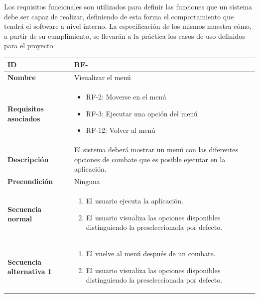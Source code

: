 Los requisitos funcionales son utilizados para definir las funciones que un sistema debe ser capaz de realizar, definiendo de esta forma el comportamiento que tendrá el software a nivel interno. La especificación de los mismos muestra cómo, a partir de su cumplimiento, se llevarán a la práctica los casos de uso definidos para el proyecto.


\setcounter{contador_requisitos_funcionales}{1}

\begin{center}
	\begin{tabular}{ | p{4.7cm} | p{10cm} | } 
		\hline
		
		\textbf{ID} & RF-\arabic{contador_requisitos_funcionales}
		{contador_requisitos_funcionales} \\
		
		\hline 
		\textbf{Nombre}&
		Visualizar el menú\\ 
		
		\hline
		\textbf{Requisitos asociados} & 
		\begin{itemize}
			\item RF-2: Moverse en el menú
			\item RF-3: Ejecutar una opción del menú
			\item RF-12: Volver al menú
		\end{itemize}\\
		
		\hline
		\textbf{Descripción} & 
		El sistema deberá mostrar un menú con las diferentes opciones de combate que es posible ejecutar en la aplicación.\\
		
		\hline
		\textbf{Precondición} & 
		Ninguna
		\\
		
		\hline
		\textbf{Secuencia normal} &
		\begin{enumerate}
			\item El usuario ejecuta la aplicación.
			\item El usuario visualiza las opciones disponibles distinguiendo la preseleccionada por defecto.
		\end{enumerate}
		\\
		
		\hline
		\textbf{Secuencia alternativa 1} &
		\begin{enumerate}
			\item El vuelve al menú después de un combate.
			\item El usuario visualiza las opciones disponibles distinguiendo la preseleccionada por defecto.
		\end{enumerate}
		\\
		

\end{tabular}
\end{center}
